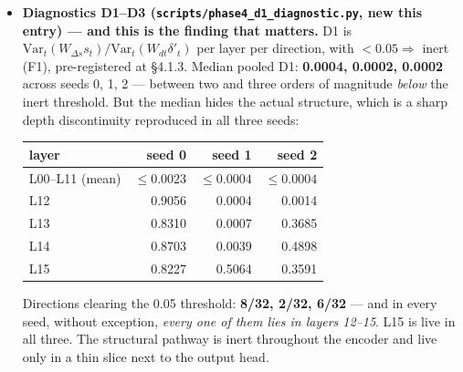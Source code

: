 \documentclass[11pt,a4paper]{article}
\newcommand{\code}[1]{\texttt{\small #1}}
\begin{document}
\begin{itemize}
Kernel floor (same $\varphi$, same masking, twice) $= 0.000$e$+00$ exactly, so
the divergences are real at floating-point resolution and not numerical noise.
Masking floor, reported as context only, $= 1.321$e$-01$: a $\varphi$ swap moves
predictions roughly \textbf{2000$\times$ less} than re-masking a seventh of the
sequence does.

Two honest caveats on this table. First, $\Delta$ is flat everywhere --- feeding
the model deliberately wrong folding costs it $+0.0001$ bits, i.e.\ nothing.
Second, the ordering S3\,$\approx$\,S1\,$\approx$\,S2\,$\gg$\,S4\,$\approx$\,S0
is what one expects if divergence tracks \emph{how far the substituted values
sit from the true ones}: S1--S3 preserve $\varphi$'s marginal and so supply
wrong-but-plausibly-scaled values, whereas S0 supplies zeros, which is the
standardised mean and therefore the closest substitute available. The ordering
confirms that the input reaches the output. It is not by itself evidence of
structural understanding.

\item \textbf{Diagnostics D1--D3 (\code{scripts/phase4\_d1\_diagnostic.py}, new
this entry) --- and this is the finding that matters.} D1 is
$\mathrm{Var}_t(W_{\Delta s}s_t)/\mathrm{Var}_t(W_{dt}\delta'_t)$ per layer per
direction, with $<0.05 \Rightarrow$ inert (F1), pre-registered at \S4.1.3.
Median pooled D1: \textbf{0.0004, 0.0002, 0.0002} across seeds 0, 1, 2 ---
between two and three orders of magnitude \emph{below} the inert threshold. But
the median hides the actual structure, which is a sharp depth discontinuity
reproduced in all three seeds:

\begin{center}
\begin{tabular}{lrrr}
\toprule
layer & seed 0 & seed 1 & seed 2 \\
\midrule
L00--L11 (mean) & $\le 0.0023$ & $\le 0.0004$ & $\le 0.0004$ \\
L12 & 0.9056 & 0.0004 & 0.0014 \\
L13 & 0.8310 & 0.0007 & 0.3685 \\
L14 & 0.8703 & 0.0039 & 0.4898 \\
L15 & 0.8227 & 0.5064 & 0.3591 \\
\bottomrule
\end{tabular}
\end{center}

Directions clearing the 0.05 threshold: \textbf{8/32, 2/32, 6/32} --- and in
every seed, without exception, \emph{every one of them lies in layers 12--15}.
L15 is live in all three. The structural pathway is inert throughout the encoder
and live only in a thin slice next to the output head.


\end{itemize}
\end{document}
